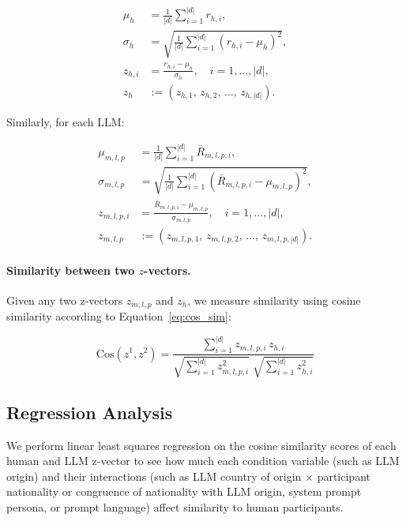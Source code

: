 \begin{align*}
\mu_{h} &= \frac{1}{|d|}\sum_{i = 1}^{|d|}r_{h,i}, \\
\sigma_h &= \sqrt{\frac{1}{|d|} \sum_{i=1}^{|d|} \left(r_{h,i} - \mu_h \right)^{2}}, \\
z_{h,i} &= \frac{r_{h,i} - \mu_{h}}{\sigma_{h}}, \quad i = 1,\ldots,|d|, \\
z_{h} &:= \left( z_{h,1},\, z_{h,2},\,\ldots,\, z_{h,|d|} \right).
\end{align*}

Similarly, for each LLM:

\begin{align*}
\mu_{m,l,p} &= \frac{1}{|d|}\sum_{i = 1}^{|d|}\bar{R}_{m,l,p,i}, \\
\sigma_{m,l,p} &= \sqrt{\frac{1}{|d|} \sum_{i=1}^{|d|} \left(\bar{R}_{m,l,p,i} - \mu_{m,l,p} \right)^{2}}, \\
z_{m,l,p,i} &= \frac{\bar{R}_{m,l,p,i} - \mu_{m,l,p}}{\sigma_{m,l,p}}, \quad i = 1,\ldots,|d|, \\
z_{m,l,p} &:= \left( z_{m,l,p,1},\, z_{m,l,p,2},\,\ldots,\, z_{m,l,p,|d|} \right).
\end{align*}

\paragraph{Similarity between two \(z\)-vectors.} 
Given any two
z-vectors \(z_{m,l,p}\) and \(z_{h}\), we measure similarity using
cosine similarity according to Equation~\ref{eq:cos_sim}:

\begin{equation}\label{eq:cos_sim}
\text{Cos}\!\left(z^{1}, z^{2}\right) 
= \frac{\sum_{i = 1}^{|d|} z_{m,l,p,i}\, z_{h,i}}
       {\sqrt{\sum_{i = 1}^{|d|} z_{m,l,p,i}^{2}} \; \sqrt{\sum_{i = 1}^{|d|} z_{h,i}^{2}}}
\end{equation}

\subsection{Regression Analysis}\label{sec:reg}

We perform linear least squares regression on the cosine similarity
scores of each human and LLM z-vector to see how much each condition
variable (such as LLM origin) and their interactions (such as LLM
country of origin $\times$ participant nationality or congruence of nationality with LLM origin, system prompt persona, or prompt language)
affect similarity to human participants. 

